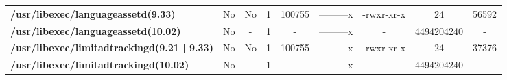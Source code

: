 \begin{center}
{\begin{tabular}{|>{\bfseries} l | C | C | C | C | C | C | C | C |}
					/usr/libexec/languageassetd(9.33) & No & No & \color{green}1 & \color{red}100755 & \color{green}---------x & \color{red}-rwxr-xr-x & \color{green}24 & \color{red}56592\\ 
					/usr/libexec/languageassetd(10.02) & No & - & 1 & - & ---------x & - & 4494204240 & -\\ 
					/usr/libexec/limitadtrackingd(9.21 | 9.33) & No & No & \color{green}1 & \color{red}100755 & \color{green}---------x & \color{red}-rwxr-xr-x & \color{green}24 & \color{red}37376\\ 
					/usr/libexec/limitadtrackingd(10.02) & No & - & 1 & - & ---------x & - & 4494204240 & -\\ 

			\end{tabular}
		}
	\end{center}



